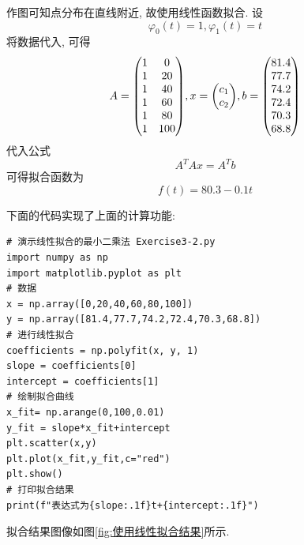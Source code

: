 \begin{solution}
    作图可知点分布在直线附近, 故使用线性函数拟合. 设
    \begin{equation*}
        \varphi_0(t)=1, \varphi_1(t)=t
    \end{equation*}
    将数据代入, 可得
    \begin{equation*}
        A=\mqty(
            1&0\\
            1&20\\
            1&40\\
            1&60\\
            1&80\\
            1&100
        ), x=\mqty(c_1\\c_2), b=\mqty(
            81.4\\77.7\\74.2\\72.4\\70.3\\68.8
        )
    \end{equation*}
    代入公式
    \begin{equation*}
        A^TAx=A^Tb
    \end{equation*}
    可得拟合函数为
    \begin{equation*}
        f(t)=80.3-0.1t
    \end{equation*}
\end{solution}

下面的代码实现了上面的计算功能:
\begin{lstlisting}
# 演示线性拟合的最小二乘法 Exercise3-2.py
import numpy as np
import matplotlib.pyplot as plt
# 数据
x = np.array([0,20,40,60,80,100])
y = np.array([81.4,77.7,74.2,72.4,70.3,68.8])
# 进行线性拟合
coefficients = np.polyfit(x, y, 1)
slope = coefficients[0]
intercept = coefficients[1]
# 绘制拟合曲线
x_fit= np.arange(0,100,0.01)
y_fit = slope*x_fit+intercept
plt.scatter(x,y)
plt.plot(x_fit,y_fit,c="red")
plt.show()
# 打印拟合结果
print(f"表达式为{slope:.1f}t+{intercept:.1f}")
\end{lstlisting}

拟合结果图像如图\ref{fig:使用线性拟合结果}所示.

